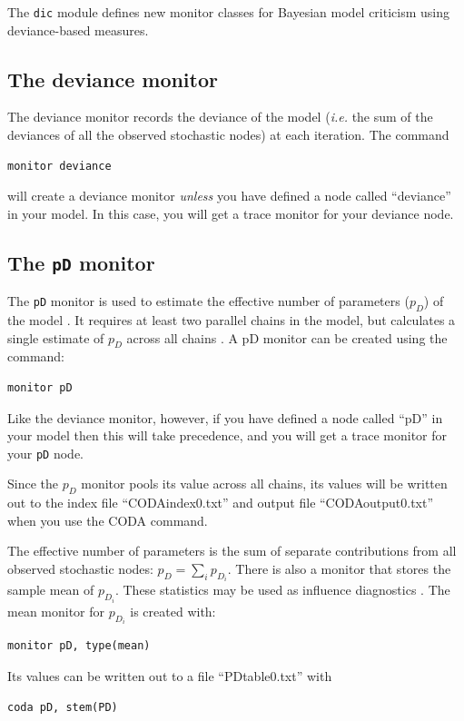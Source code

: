 \documentclass[11pt, a4paper, titlepage]{report}
\begin{document}
The \texttt{dic} module defines new monitor classes for Bayesian model
criticism using deviance-based measures. 

\subsection{The deviance monitor}

The deviance monitor records the deviance of the model ({\em i.e.} the
sum of the deviances of all the observed stochastic nodes) at each
iteration. The command
\begin{verbatim}
monitor deviance
\end{verbatim}
will create a deviance monitor {\em unless} you have defined a node
called ``deviance'' in your model. In this case, you will get a trace
monitor for your deviance node.

\subsection{The \texttt{pD} monitor}

The \verb+pD+ monitor is used to estimate the effective number of
parameters ($p_D$) of the model \citep{spiegelhalter:etal:2002}. It
requires at least two parallel chains in the model, but calculates
a single estimate of $p_D$ across all chains \citep{plummer:2002}.
A pD monitor can be created using the command:
\begin{verbatim}
monitor pD
\end{verbatim}
Like the deviance monitor, however, if you have defined a node called
``pD'' in your model then this will take precedence, and you will get
a trace monitor for your \verb+pD+ node.

Since the $p_D$ monitor pools its value across all chains, its values
will be written out to the index file ``CODAindex0.txt'' and
output file ``CODAoutput0.txt'' when you use the CODA command.

The effective number of parameters is the sum of separate contributions
from all observed stochastic nodes: $p_D = \sum_i p_{D_i}$. There is
also a monitor that stores the sample mean of $p_{D_i}$. These statistics
may be used as influence diagnostics \citep{spiegelhalter:etal:2002}.
The mean monitor for $p_{D_i}$ is created with:
\begin{verbatim}
monitor pD, type(mean)
\end{verbatim}
Its values can be written out to a file ``PDtable0.txt'' with
\begin{verbatim}
coda pD, stem(PD)
\end{verbatim}
\end{document}

